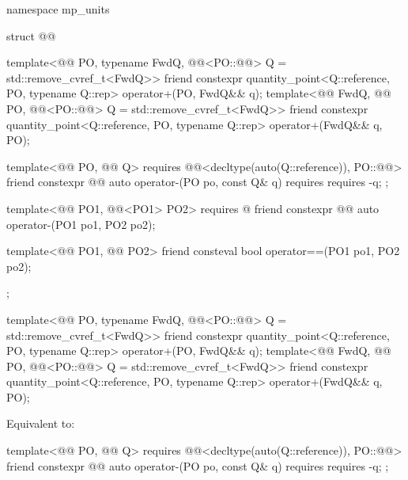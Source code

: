 \begin{codeblock}
namespace mp_units {

struct @@ {
  template<@@ PO, typename FwdQ,
           @@<PO::@@> Q = std::remove_cvref_t<FwdQ>>
  friend constexpr quantity_point<Q::reference, PO{}, typename Q::rep> operator+(PO, FwdQ&& q);
  template<@@ FwdQ, @@ PO,
           @@<PO::@@> Q = std::remove_cvref_t<FwdQ>>
  friend constexpr quantity_point<Q::reference, PO{}, typename Q::rep> operator+(FwdQ&& q, PO);

  template<@@ PO, @@ Q>
    requires @@<decltype(auto(Q::reference)), PO::@@>
  friend constexpr @@ auto operator-(PO po, const Q& q)
    requires requires { -q; };

  template<@@ PO1, @@<PO1{}> PO2>
    requires @\seebelownc@
  friend constexpr @@ auto operator-(PO1 po1, PO2 po2);

  template<@@ PO1, @@ PO2>
  friend consteval bool operator==(PO1 po1, PO2 po2);
};

}
\end{codeblock}

\begin{itemdecl}
template<@@ PO, typename FwdQ,
         @@<PO::@@> Q = std::remove_cvref_t<FwdQ>>
friend constexpr quantity_point<Q::reference, PO{}, typename Q::rep> operator+(PO, FwdQ&& q);
template<@@ FwdQ, @@ PO,
         @@<PO::@@> Q = std::remove_cvref_t<FwdQ>>
friend constexpr quantity_point<Q::reference, PO{}, typename Q::rep> operator+(FwdQ&& q, PO);
\end{itemdecl}

\begin{itemdescr}
\pnum
\effects
Equivalent to:
\end{itemdescr}

\begin{itemdecl}
template<@@ PO, @@ Q>
  requires @@<decltype(auto(Q::reference)), PO::@@>
friend constexpr @@ auto operator-(PO po, const Q& q)
  requires requires { -q; };
\end{itemdecl}

